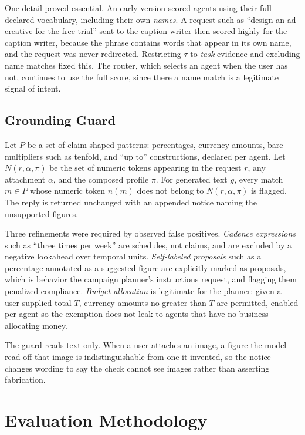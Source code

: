 \documentclass[9pt,twocolumn]{extarticle}
\begin{document}
One detail proved essential. An early version scored agents using their full
declared vocabulary, including their own \textit{names}. A request such as
``design an ad creative for the free trial'' sent to the caption writer then
scored highly for the caption writer, because the phrase contains words that
appear in its own name, and the request was never redirected. Restricting
$\tau$ to \textit{task} evidence and excluding name matches fixed this. The
router, which selects an agent when the user has not, continues to use the full
score, since there a name match is a legitimate signal of intent.

\subsection{Grounding Guard}
Let $P$ be a set of claim-shaped patterns: percentages, currency amounts, bare
multipliers such as tenfold, and ``up to'' constructions, declared per agent.
Let $N(r, \alpha, \pi)$ be the set of numeric tokens appearing in the request
$r$, any attachment $\alpha$, and the composed profile $\pi$. For generated
text $g$, every match $m \in P$ whose numeric token $n(m)$ does not belong to
$N(r,\alpha,\pi)$ is flagged. The reply is returned unchanged with an appended
notice naming the unsupported figures.

Three refinements were required by observed false positives.
\textit{Cadence expressions} such as ``three times per week'' are schedules,
not claims, and are excluded by a negative lookahead over temporal units.
\textit{Self-labeled proposals} such as a percentage annotated as a suggested
figure are explicitly marked as proposals, which is behavior the campaign
planner's instructions request, and flagging them penalized compliance.
\textit{Budget allocation} is legitimate for the planner: given a user-supplied
total $T$, currency amounts no greater than $T$ are permitted, enabled per
agent so the exemption does not leak to agents that have no business
allocating money.

The guard reads text only. When a user attaches an image, a figure the model
read off that image is indistinguishable from one it invented, so the notice
changes wording to say the check cannot see images rather than asserting
fabrication.

\section{Evaluation Methodology}
\end{document}

